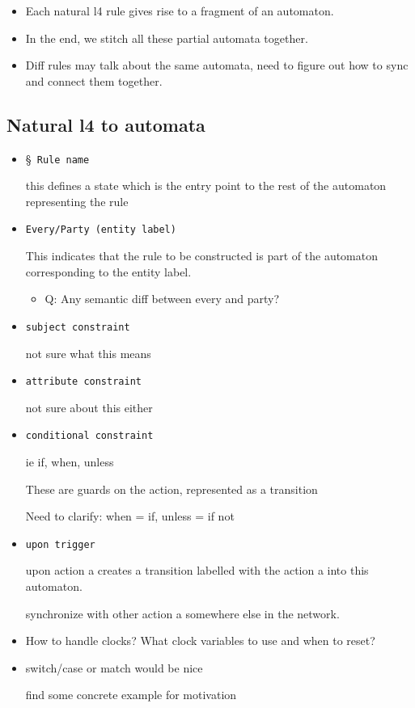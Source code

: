 \begin{itemize}
  \item Each natural l4 rule gives rise to a fragment of an automaton. 

  \item In the end, we stitch all these partial automata together.

  \item Diff rules may talk about the same automata, need to figure out how
  to sync and connect them together.
\end{itemize}

\subsection{Natural l4 to automata}
\begin{itemize}
  \item \S \texttt{ Rule name}
  
  this defines a state which is the entry point to the rest of the automaton
  representing the rule

  \item \texttt{Every/Party (entity label)}

  This indicates that the rule to be constructed is part of the automaton
  corresponding to the entity label.

  \begin{itemize}
    \item Q: Any semantic diff between every and party?
  \end{itemize}

  \item \texttt{subject constraint}

  not sure what this means

  \item \texttt{attribute constraint}

  not sure about this either

  \item \texttt{conditional constraint}

  ie if, when, unless

  These are guards on the action, represented as a transition
  
  Need to clarify: when = if, unless = if not

  \item \texttt{upon trigger}

  upon action a creates a transition labelled with the action a into
  this automaton.

  synchronize with other action a somewhere else in the network.

  \item How to handle clocks? What clock variables to use and when
  to reset?

  \item switch/case or match would be nice
  
  find some concrete example for motivation
\end{itemize}

